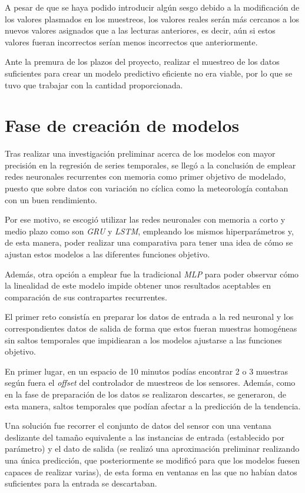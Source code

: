 A pesar de que se haya podido introducir algún sesgo debido a la modificación de los valores plasmados en los muestreos, 
los valores reales serán más cercanos a los nuevos valores asignados que a las lecturas anteriores, es decir, aún si 
estos valores fueran incorrectos serían menos incorrectos que anteriormente.

Ante la premura de los plazos del proyecto, realizar el muestreo de los datos suficientes para crear un modelo predictivo
eficiente no era viable, por lo que se tuvo que trabajar con la cantidad proporcionada.

\section{Fase de creación de modelos}
Tras realizar una investigación preliminar acerca de los modelos con mayor precisión 
en la regresión de series temporales, se llegó a la conclusión de emplear
redes neuronales recurrentes con memoria como primer objetivo de modelado, 
puesto que sobre datos con variación no cíclica como la meteorología contaban 
con un buen rendimiento.

Por ese motivo, se escogió utilizar las redes neuronales con memoria a corto y medio
plazo como son \textit{GRU} y \textit{LSTM}, empleando los mismos hiperparámetros y,
de esta manera, poder realizar una comparativa para tener una idea de cómo se 
ajustan estos modelos a las diferentes funciones objetivo.

Además, otra opción a emplear fue la tradicional \textit{MLP} para poder observar
cómo la linealidad de este modelo impide obtener unos resultados aceptables en comparación
de sus contrapartes recurrentes.

El primer reto consistía en preparar los datos de entrada a la red neuronal y los 
correspondientes datos de salida de forma que estos fueran muestras homogéneas
sin saltos temporales que impidiearan a los modelos ajustarse a las funciones objetivo.

En primer lugar, en un espacio de 10 minutos podías encontrar 2 o 3 muestras según fuera 
el \textit{offset} del controlador de muestreos de los sensores.
Además, como en la fase de preparación de los datos se realizaron descartes, se generaron, de esta manera,
saltos temporales que podían afectar a la predicción de la tendencia.

Una solución fue recorrer el conjunto de datos del sensor con una ventana deslizante del tamaño
equivalente a las instancias de entrada (establecido por parámetro) y el dato de salida (se realizó una 
aproximación preliminar realizando una única predicción, que posteriormente se modificó para 
que los modelos fuesen capaces de realizar varias), de esta forma en ventanas en las que 
no habían datos suficientes para la entrada se descartaban.

